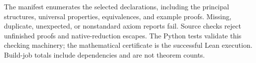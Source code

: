 The manifest enumerates the selected declarations, including the principal structures, universal
properties, equivalences, and example proofs. Missing, duplicate, unexpected, or nonstandard axiom
reports fail. Source checks reject unfinished proofs and native-reduction escapes. The Python tests
validate this checking machinery; the mathematical certificate is the successful Lean execution.
Build-job totals include dependencies and are not theorem counts.
